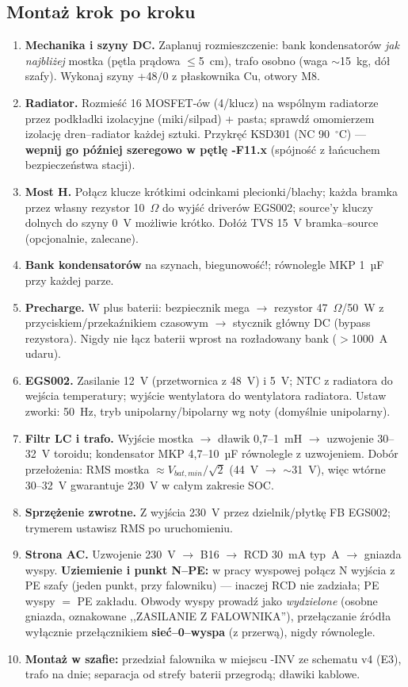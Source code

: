 \documentclass[11pt,a4paper]{article}
\newcommand{\ohm}{$\Omega$}
\begin{document}
\subsection{Montaż krok po kroku}
\begin{enumerate}
\item \textbf{Mechanika i szyny DC.} Zaplanuj rozmieszczenie: bank kondensatorów \emph{jak
najbliżej} mostka (pętla prądowa $\le$5~cm), trafo osobno (waga $\sim$15~kg, dół szafy).
Wykonaj szyny +48/0 z płaskownika Cu, otwory M8.
\item \textbf{Radiator.} Rozmieść 16 MOSFET-ów (4/klucz) na wspólnym radiatorze przez podkładki
izolacyjne (miki/silpad) + pasta; sprawdź omomierzem izolację dren--radiator każdej sztuki.
Przykręć KSD301 (NC 90~$^\circ$C) --- \textbf{wepnij go później szeregowo w pętlę -F11.x} (spójność
z łańcuchem bezpieczeństwa stacji).
\item \textbf{Most H.} Połącz klucze krótkimi odcinkami plecionki/blachy; każda bramka przez
własny rezystor 10~\ohm{} do wyjść driverów EGS002; source'y kluczy dolnych do szyny 0~V możliwie
krótko. Dołóż TVS 15~V bramka--source (opcjonalnie, zalecane).
\item \textbf{Bank kondensatorów} na szynach, biegunowość!; równolegle MKP 1~µF przy każdej parze.
\item \textbf{Precharge.} W plus baterii: bezpiecznik mega $\to$ rezystor 47~\ohm{}/50~W z
przyciskiem/przekaźnikiem czasowym $\to$ stycznik główny DC (bypass rezystora). Nigdy nie łącz
baterii wprost na rozładowany bank ($>$1000~A udaru).
\item \textbf{EGS002.} Zasilanie 12~V (przetwornica z 48~V) i 5~V; NTC z radiatora do wejścia
temperatury; wyjście wentylatora do wentylatora radiatora. Ustaw zworki: 50~Hz, tryb
unipolarny/bipolarny wg noty (domyślnie unipolarny).
\item \textbf{Filtr LC i trafo.} Wyjście mostka $\to$ dławik 0,7--1~mH $\to$ uzwojenie 30--32~V
toroidu; kondensator MKP 4,7--10~µF równolegle z uzwojeniem. Dobór przełożenia: RMS mostka
$\approx V_{bat,min}/\sqrt{2}$ (44~V $\to$ $\sim$31~V), więc wtórne 30--32~V gwarantuje 230~V
w całym zakresie SOC.
\item \textbf{Sprzężenie zwrotne.} Z wyjścia 230~V przez dzielnik/płytkę FB EGS002; trymerem
ustawisz RMS po uruchomieniu.
\item \textbf{Strona AC.} Uzwojenie 230~V $\to$ B16 $\to$ RCD 30~mA typ~A $\to$ gniazda wyspy.
\textbf{Uziemienie i punkt N--PE:} w pracy wyspowej połącz N wyjścia z PE szafy (jeden punkt,
przy falowniku) --- inaczej RCD nie zadziała; PE wyspy $=$ PE zakładu. Obwody wyspy prowadź jako
\emph{wydzielone} (osobne gniazda, oznakowane ,,ZASILANIE Z FALOWNIKA''), przełączanie
źródła wyłącznie przełącznikiem \textbf{sieć--0--wyspa} (z przerwą), nigdy równolegle.
\item \textbf{Montaż w szafie:} przedział falownika w miejscu -INV ze schematu v4 (E3), trafo na
dnie; separacja od strefy baterii przegrodą; dławiki kablowe.
\end{enumerate}
\end{document}
